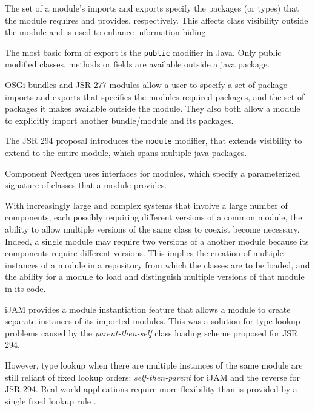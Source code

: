
The set of a module's imports and exports specify the packages (or types) that
the module requires and provides, respectively. This affects class
visibility outside the module and is used to enhance information hiding. 

The most basic form of export is the {\tt public} modifier in Java. Only
public modified classes, methods or fields are available outside a java package.

OSGi bundles and JSR 277 modules allow a user to specify a set of package imports 
and exports that specifies the modules required packages, and the set of packages 
it makes available outside the module. They also both allow a module
to explicitly import another bundle/module and its packages.

The JSR 294\cite{JSR294} proposal introduces the {\tt module} modifier, that
extends visibility to extend to the entire module, which spans multiple java
packages.

Component Nextgen \cite{componentnextgen} uses interfaces for modules, which
specify a parameterized signature of classes that a module provides.

With increasingly large and complex systems that involve a large number of components,
each possibly requiring different versions of a common module,
the ability to allow multiple versions of the same class to coexist become necessary.
Indeed, a single module may require two versions of a another module because its
components require different versions. This implies the creation of multiple instances 
of a module in a repository from which the classes are to be loaded, and the ability
for a module to load and distinguish multiple versions of that module in its code.

iJAM \cite{iJAM} provides a module instantiation feature that allows a module to create
separate instances of its imported modules. This was a solution for type lookup
problems caused by the {\it parent-then-self} class loading scheme proposed for
JSR 294.

However, type lookup when there are multiple instances of the same module are still
reliant of fixed lookup orders: {\it self-then-parent} for iJAM and the reverse for JSR 294.
Real world applications require more flexibility than is provided by a single fixed
lookup rule \cite{iJAMComments}.